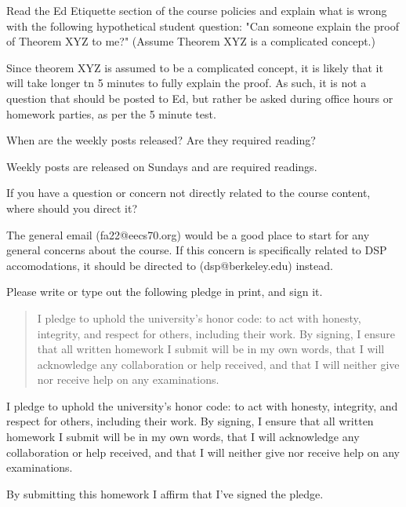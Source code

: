 \documentclass[11pt]{article}
\begin{document}
\begin{Parts}
  
    \Part Read the Ed Etiquette section of the course policies and explain what is wrong with the following hypothetical student question: "Can someone explain the proof of Theorem XYZ to me?" (Assume Theorem XYZ is a complicated concept.)

    \begin{solution}
      Since theorem XYZ is assumed to be a complicated concept, it is likely that it will take longer tn 5 minutes to fully explain the proof. As such, it is not a question that should be posted to Ed, but rather be asked during office hours or homework parties, as per the 5 minute test.
    \end{solution}

    \Part When are the weekly posts released? Are they required reading?

    \begin{solution}
      Weekly posts are released on Sundays and are required readings.
    \end{solution}

    \Part If you have a question or concern not directly related to the course content, where should you direct it?

    \begin{solution}
      The general email (fa22@eecs70.org) would be a good place to start for any general concerns about the course. If this concern is specifically related to DSP accomodations, it should be directed to (dsp@berkeley.edu) instead.
    \end{solution}

\end{Parts}


Please write or type out the following pledge in print, and sign it.

\begin{quote}
I pledge to uphold the university's honor code: to act with honesty, integrity, and respect for others, including their work. By signing, I ensure that all written homework I submit will be in my own words, that I will acknowledge any collaboration or help received, and that I will neither give nor receive help on any examinations. 
\end{quote}

\begin{solution}
  I pledge to uphold the university's honor code: to act with honesty, integrity, and respect for others, including their work. By signing, I ensure that all written homework I submit will be in my own words, that I will acknowledge any collaboration or help received, and that I will neither give nor receive help on any examinations. 

  By submitting this homework I affirm that I've signed the pledge.
\end{solution}
\end{document}
